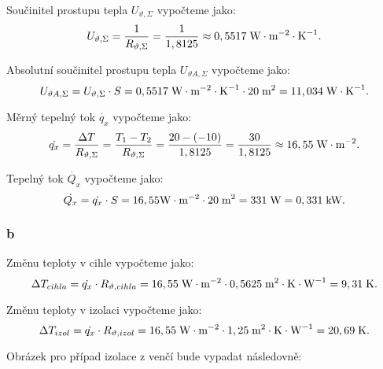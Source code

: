 \documentclass{article}
\begin{document}
Součinitel prostupu tepla $U_{\vartheta,\Sigma}$ vypočteme jako:
$$
    U_{\vartheta,\Sigma} = \frac{1}{R_{\vartheta,\Sigma}} = \frac{1}{1,8125} \approx 0,5517 \; \textrm{W} \cdot \textrm{m}^{-2} \cdot \textrm{K}^{-1}.
$$

Absolutní součinitel prostupu tepla $U_{\vartheta A,\Sigma}$ vypočteme jako:
$$
    U_{\vartheta A,\Sigma} = U_{\vartheta,\Sigma} \cdot S = 0,5517 \; \textrm{W} \cdot \textrm{m}^{-2} \cdot \textrm{K}^{-1} \cdot 20 \; \textrm{m}^{\textrm{2}} = 11,034 \; \textrm{W} \cdot \textrm{K}^{-1}.
$$

Měrný tepelný tok $\dot{q_x}$ vypočteme jako:
$$
    \dot{q_x} = \frac{\Delta T}{R_{\vartheta,\Sigma}} = \frac{T_1 - T_2}{R_{\vartheta,\Sigma}} = \frac{20 - (-10)}{1,8125} = \frac{30}{1,8125} \approx 16,55 \; \textrm{W} \cdot \textrm{m}^{-2}.
$$

Tepelný tok $\dot{Q_x}$ vypočteme jako:
$$
    \dot{Q_x} = \dot{q_x} \cdot S = 16,55 \textrm{W} \cdot \textrm{m}^{-2} \cdot 20 \; \textrm{m}^{\textrm{2}} = 331 \; \textrm{W} = 0,331 \; \textrm{kW}.
$$


\subsubsection{b}
Změnu teploty v cihle vypočteme jako:
$$
    \Delta T_{cihla} = \dot{q_x} \cdot R_{\vartheta,cihla} = 16,55 \; \textrm{W} \cdot \textrm{m}^{-2} \cdot 0,5625 \; \textrm{m}^{\textrm{2}} \cdot \textrm{K} \cdot \textrm{W}^{-1} = 9,31 \; \textrm{K}.
$$

Změnu teploty v izolaci vypočteme jako:
$$
    \Delta T_{izol} = \dot{q_x} \cdot R_{\vartheta,izol} = 16,55 \; \textrm{W} \cdot \textrm{m}^{-2} \cdot 1,25 \; \textrm{m}^{\textrm{2}} \cdot \textrm{K} \cdot \textrm{W}^{-1} = 20,69 \; \textrm{K}.
$$

Obrázek pro případ izolace z venčí bude vypadat následovně:
\end{document}
